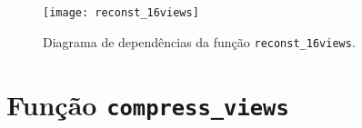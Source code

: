 \begin{figure}[!hp]
    \centering
    \texttt{[image: reconst\_16views]}
    \caption{Diagrama de dependências da função \texttt{reconst\_16views}.}
    \label{fig:reconst_16views}
\end{figure}



\newpage
\section{Função \texttt{compress\_views}}
\label{sec::doc-codigo:compress_views}

